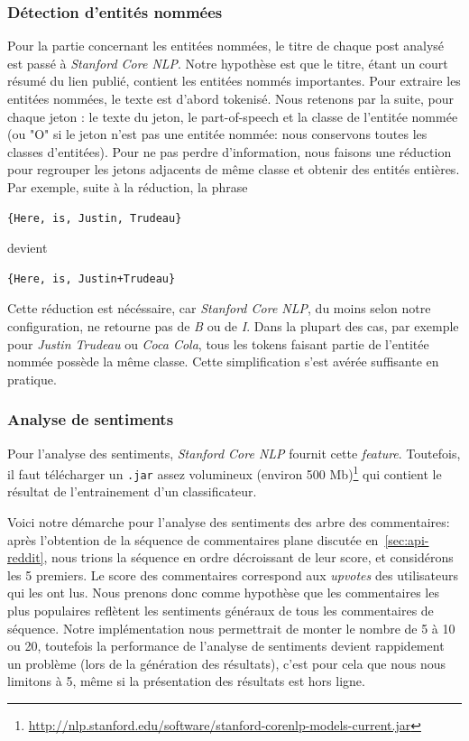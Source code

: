 \documentclass[12pt]{article}
\begin{document}
\subsubsection{Détection d'entités nommées}
\label{sec:named-entities}

Pour la partie concernant les entitées nommées, le titre de chaque post analysé est passé à \textit{Stanford Core NLP}. Notre hypothèse est que le titre, étant un court
résumé du lien publié, contient les entitées nommés importantes.
Pour extraire les entitées nommées, le texte est d'abord tokenisé. Nous retenons par la suite, pour chaque jeton : le texte du jeton, le part-of-speech et la classe de l'entitée nommée (ou "O" si le jeton n'est pas une entitée nommée: nous conservons toutes les classes d'entitées). Pour ne pas perdre d'information, nous faisons une réduction pour regrouper les jetons adjacents de même classe et obtenir des entités entières. Par exemple, suite à la réduction, la phrase

\begin{verbatim}
{Here, is, Justin, Trudeau}
\end{verbatim}

devient

\begin{verbatim}
{Here, is, Justin+Trudeau}
\end{verbatim}

Cette réduction est nécéssaire, car \textit{Stanford Core NLP}, du moins selon notre configuration, ne retourne pas de \textit{B} ou de \textit{I}.
Dans la plupart des cas, par exemple pour \emph{Justin Trudeau} ou \emph{Coca Cola}, tous les tokens faisant partie de l'entitée nommée possède la même
classe. Cette simplification s'est avérée suffisante en pratique.

\subsubsection{Analyse de sentiments}
\label{sec:sentiment-analysis}

Pour l'analyse des sentiments, \textit{Stanford Core NLP} fournit cette \textit{feature}. Toutefois, il faut télécharger un \verb;.jar; assez volumineux (environ 500 Mb)\footnote{\url{http://nlp.stanford.edu/software/stanford-corenlp-models-current.jar}} qui contient le résultat de l'entrainement d'un classificateur.


Voici notre démarche pour l'analyse des sentiments des arbre des commentaires: après l'obtention de la séquence de commentaires plane discutée en~\ref{sec:api-reddit}, nous trions la séquence en ordre décroissant de leur score, et considérons les 5 premiers. Le score des commentaires correspond aux \textit{upvotes} des utilisateurs qui les ont lus. Nous prenons donc comme hypothèse que les commentaires les plus populaires reflètent les sentiments généraux de tous les commentaires de séquence. Notre implémentation nous permettrait de monter le nombre de 5 à 10 ou 20, toutefois la performance de l'analyse de sentiments devient rappidement un problème (lors de la génération des résultats), c'est pour cela que nous nous limitons à 5, même si la présentation des résultats est hors ligne.
\end{document}

